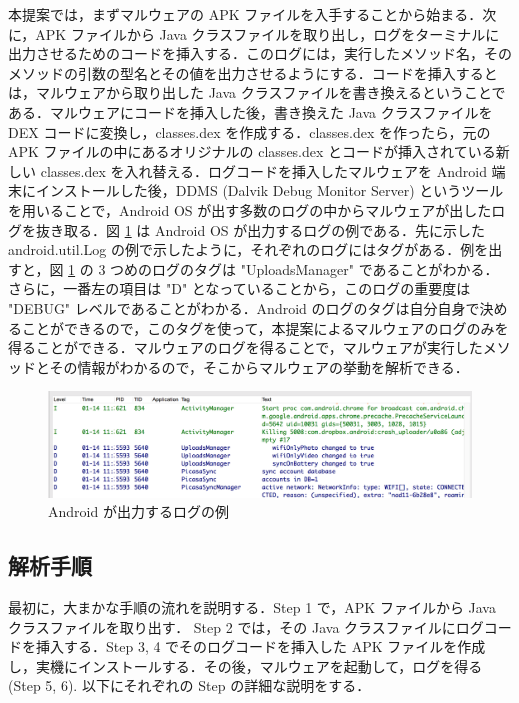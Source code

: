 本提案では，まずマルウェアの APK ファイルを入手することから始まる．次に，APK ファイルから Java クラスファイルを取り出し，ログをターミナルに出力させるためのコードを挿入する．このログには，実行したメソッド名，そのメソッドの引数の型名とその値を出力させるようにする．コードを挿入するとは，マルウェアから取り出した Java クラスファイルを書き換えるということである．マルウェアにコードを挿入した後，書き換えた Java クラスファイルを DEX コードに変換し，classes.dex を作成する．classes.dex を作ったら，元の APK ファイルの中にあるオリジナルの classes.dex とコードが挿入されている新しい classes.dex を入れ替える．ログコードを挿入したマルウェアを Android 端末にインストールした後，DDMS (Dalvik Debug Monitor Server) というツールを用いることで，Android OS が出す多数のログの中からマルウェアが出したログを抜き取る．図 \ref{examplelog} は Android OS が出力するログの例である．先に示した android.util.Log の例で示したように，それぞれのログにはタグがある．例を出すと，図 \ref{examplelog} の 3 つめのログのタグは "UploadsManager" であることがわかる．さらに，一番左の項目は "D"  となっていることから，このログの重要度は "DEBUG" レベルであることがわかる．Android のログのタグは自分自身で決めることができるので，このタグを使って，本提案によるマルウェアのログのみを得ることができる．マルウェアのログを得ることで，マルウェアが実行したメソッドとその情報がわかるので，そこからマルウェアの挙動を解析できる．

\begin{figure}[t]
\begin{center}
\includegraphics[scale=0.2]{androidlogexample.eps}
\end{center}
\caption{Android が出力するログの例}
\label{examplelog}
\end{figure}

\subsection{解析手順}
\label{analysismethod}
最初に，大まかな手順の流れを説明する．Step 1 で，APK ファイルから Java クラスファイルを取り出す． Step 2 では，その Java クラスファイルにログコードを挿入する．Step 3, 4  でそのログコードを挿入した APK ファイルを作成し，実機にインストールする．その後，マルウェアを起動して，ログを得る (Step 5, 6). 以下にそれぞれの Step の詳細な説明をする．

